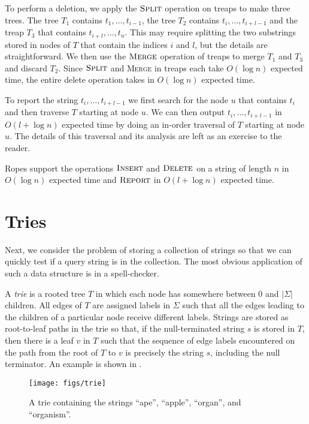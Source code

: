To perform a deletion, we apply the $\textsc{Split}$ operation on treaps
to make three trees.  The tree $T_1$ contains $t_1,\ldots,t_{i-1}$,
the tree $T_2$ contains $t_{i},\ldots,t_{i+l-1}$ and the treap $T_3$
that contains $t_{i+l},\ldots,t_n$.  This may require splitting the two
substrings stored in nodes of $T$ that contain the indices $i$ and $l$,
but the details are straightforward.  We then use the $\textsc{Merge}$
operation of treaps to merge $T_1$ and $T_3$ and discard $T_2$. Since
$\textsc{Split}$ and \textsc{Merge} in treaps each take $O(\log n)$
expected time, the entire delete operation takes in $O(\log n)$
expected time.

To report the string $t_i,\ldots,t_{i+l-1}$ we first search for the
node $u$ that contains $t_i$ and then traverse $T$ starting at node
$u$.  We can then output $t_i,\ldots,t_{i+l-1}$ in $O(l+\log n)$
expected time by doing an in-order traversal of $T$ starting at node
$u$.  The details of this traversal and its analysis are left as an
exercise to the reader.

\begin{thm}
Ropes support the operations $\textsc{Insert}$ and $\textsc{Delete}$
on a string of length $n$ in $O(\log n)$ expected time and
$\textsc{Report}$ in $O(l+\log n)$ expected time.
\end{thm}

\section{Tries}

Next, we consider the problem of storing a collection of strings so
that we can quickly test if a query string is in the collection.  The
most obvious application of such a data structure is in a
spell-checker.

A \emph{trie} is a rooted tree $T$ in which each node has somewhere
between $0$ and $|\Sigma|$ children.  All edges of $T$ are assigned labels
in $\Sigma$ such that all the edges leading to the children
of a particular node receive different labels.  Strings are stored as
root-to-leaf paths in the trie so that, if the null-terminated string
$s$ is stored in $T$, then there is a leaf $v$ in $T$ such that the
sequence of edge labels encountered on the path from the root of $T$
to $v$ is precisely the string $s$, including the null terminator.
An example is shown in .

\begin{figure}
  \begin{center}
    \texttt{[image: figs/trie]}
  \end{center}
  \caption{A trie containing the strings ``ape'', ``apple'', ``organ'', and ``organism''.}
\end{figure}


